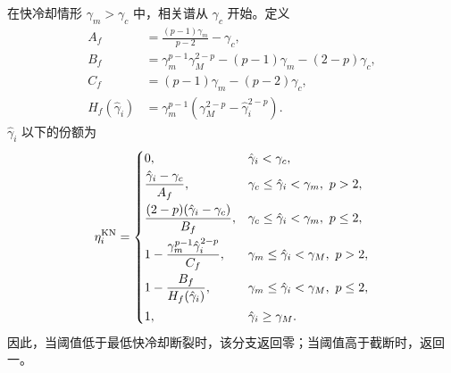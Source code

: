 \documentclass[twocolumn]{aastex702}
\begin{document}
在快冷却情形 \(\gamma_m>\gamma_c\) 中，相关谱从 \(\gamma_c\) 开始。定义
\begin{equation}
\begin{aligned}
A_f&=\frac{(p-1)\gamma_m}{p-2}-\gamma_c,\\
B_f&=\gamma_m^{p-1}\gamma_M^{2-p}
-(p-1)\gamma_m-(2-p)\gamma_c,\\
C_f&=(p-1)\gamma_m-(p-2)\gamma_c,\\
H_f(\hat\gamma_i)&=
\gamma_m^{p-1}(\gamma_M^{2-p}-\hat\gamma_i^{2-p}).
\end{aligned}
\end{equation}
\(\hat\gamma_i\) 以下的份额为
\begin{equation}
\eta_i^{\rm KN}=
\begin{cases}
0, & \hat\gamma_i<\gamma_c,\\[0.6ex]
\dfrac{\hat\gamma_i-\gamma_c}{A_f},
& \gamma_c\le\hat\gamma_i<\gamma_m,\ p>2,\\[2ex]
\dfrac{(2-p)(\hat\gamma_i-\gamma_c)}{B_f},
& \gamma_c\le\hat\gamma_i<\gamma_m,\ p\le2,\\[2ex]
1-\dfrac{\gamma_m^{p-1}\hat\gamma_i^{2-p}}{C_f},
& \gamma_m\le\hat\gamma_i<\gamma_M,\ p>2,\\[2ex]
1-\dfrac{B_f}{H_f(\hat\gamma_i)},
& \gamma_m\le\hat\gamma_i<\gamma_M,\ p\le2,\\[2ex]
1, & \hat\gamma_i\ge\gamma_M.
\end{cases}
\end{equation}
因此，当阈值低于最低快冷却断裂时，该分支返回零；当阈值高于截断时，返回一。
\end{document}
